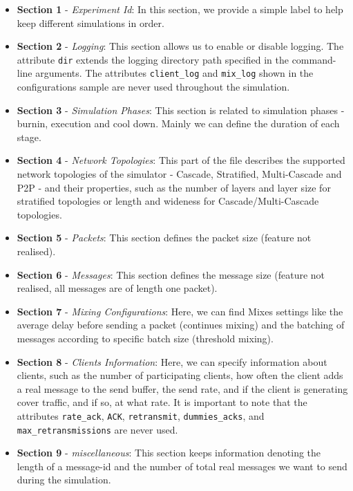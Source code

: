 \documentclass[logo,msc,cyber]{infthesis}   %
\begin{document}
\begin{itemize}
    \item \textbf{Section 1} - \emph{Experiment Id}: In this section, we provide
    a simple label to help keep different simulations in order.
    \item \textbf{Section 2} - \emph{Logging}: This section allows us to enable
    or disable logging. The attribute \texttt{dir} extends the logging directory path
    specified in the command-line arguments. The attributes \texttt{client\_log}
    and \texttt{mix\_log} shown in the configurations sample are never used
    throughout the simulation.
    \item \textbf{Section 3} - \emph{Simulation Phases}:  This section is
    related to simulation phases - burnin, execution and cool down. Mainly we
    can define the duration of each stage.
    \item \textbf{Section 4} - \emph{Network Topologies}:  This part of the file
    describes the supported network topologies of the simulator - Cascade,
    Stratified, Multi-Cascade and P2P - and their properties, such as the number
    of layers and layer size for stratified topologies or length and wideness
    for Cascade/Multi-Cascade topologies.
    \item \textbf{Section 5} - \emph{Packets}: This section defines the packet
    size (feature not realised).
    \item \textbf{Section 6} - \emph{Messages}: This section defines the message
    size (feature not realised, all messages are of length one packet).
    \item \textbf{Section 7} - \emph{Mixing Configurations}: Here, we can find
    Mixes settings like the average delay before sending a packet (continues
    mixing) and the batching of messages according to specific batch size
    (threshold mixing). 
    \item \textbf{Section 8} - \emph{Clients Information}: Here, we can specify
    information about clients, such as the number of participating clients, how
    often the client adds a real message to the send buffer, the send rate, and
    if the client is generating cover traffic, and if so, at what rate. It is
    important to note that the attributes \texttt{rate\_ack}, \texttt{ACK},
    \texttt{retransmit}, \texttt{dummies\_acks}, and
    \texttt{max\_retransmissions} are never used. 
    \item \textbf{Section 9} - \emph{miscellaneous}: This section keeps
    information denoting the length of a message-id and the number of total real
    messages we want to send during the simulation.
\end{itemize}
\end{document}
